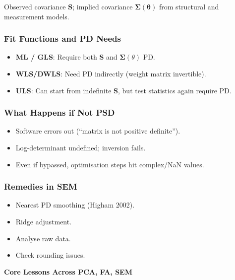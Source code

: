 \documentclass[
  12pt,
]{article}
\providecommand{\tightlist}{%
  \setlength{\itemsep}{0pt}\setlength{\parskip}{0pt}}
\theoremstyle{plain}
\theoremstyle{definition}
\theoremstyle{remark}
\begin{document}
Observed covariance \(\mathbf{S}\); implied covariance
\(\boldsymbol\Sigma(\boldsymbol\theta)\) from structural and measurement
models.

\subsubsection{Fit Functions and PD
Needs}\label{fit-functions-and-pd-needs}

\begin{itemize}
\tightlist
\item
  \textbf{ML / GLS}: Require both \(\mathbf{S}\) and
  \(\boldsymbol\Sigma(\theta)\) PD.
\item
  \textbf{WLS/DWLS}: Need PD indirectly (weight matrix invertible).
\item
  \textbf{ULS}: Can start from indefinite \(\mathbf{S}\), but test
  statistics again require PD.
\end{itemize}

\subsubsection{What Happens if Not PSD}\label{what-happens-if-not-psd}

\begin{itemize}
\tightlist
\item
  Software errors out (``matrix is not positive definite'').
\item
  Log-determinant undefined; inversion fails.
\item
  Even if bypassed, optimisation steps hit complex/NaN values.
\end{itemize}

\subsubsection{Remedies in SEM}\label{remedies-in-sem}

\begin{itemize}
\tightlist
\item
  Nearest PD smoothing (Higham 2002).
\item
  Ridge adjustment.
\item
  Analyse raw data.
\item
  Check rounding issues.
\end{itemize}

\textbf{Core Lessons Across PCA, FA, SEM}
\end{document}
